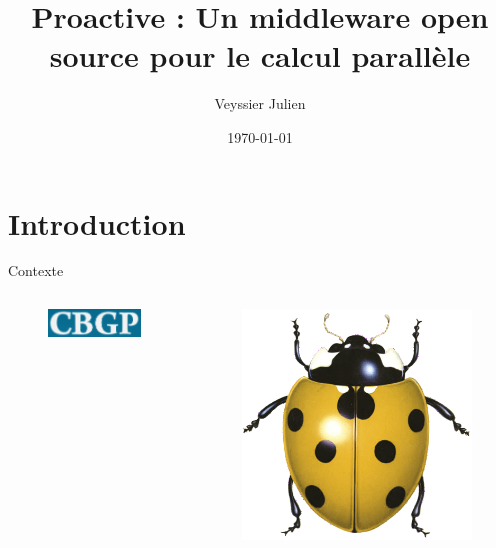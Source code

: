 \documentclass{beamer}
\title{Proactive : Un middleware open source pour le calcul parallèle}
\author{Veyssier Julien}
\institute{CBGP - INRA}
\date\today
\begin{document}
\begin{frame}
\titlepage
\end{frame}

\begin{frame}
\tableofcontents
\end{frame}

\section[Introduction]{Introduction}
\begin{frame}
	\tableofcontents[currentsection]
\end{frame}

\begin{frame}{Contexte}
	\begin{columns}
	\begin{column}[l]{0.5\linewidth}
        \begin{columns}
        \begin{column}[l]{0.5\linewidth}
        \begin{figure}
            \centering
            \includegraphics[scale=0.32]{cbgp.png}
        \end{figure}
        \end{column}
        \begin{column}[r]{0.5\linewidth}
        \begin{figure}
            \centering
            \includegraphics[scale=0.32]{cocci.png}

\end{figure}
\end{column}
\end{columns}
\end{column}
\end{columns}
\end{frame}
\end{document}
